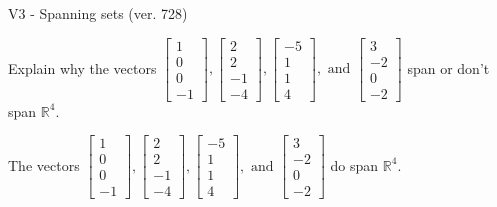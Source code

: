 \begin{exercise}
  \begin{exerciseTitle}V3 - Spanning sets (ver. 728)\end{exerciseTitle}
  \begin{exerciseStatement}
    Explain why the vectors \(\left[\begin{array}{r}
1 \\
0 \\
0 \\
-1
\end{array}\right] , \left[\begin{array}{r}
2 \\
2 \\
-1 \\
-4
\end{array}\right] , \left[\begin{array}{r}
-5 \\
1 \\
1 \\
4
\end{array}\right] , \text{ and } \left[\begin{array}{r}
3 \\
-2 \\
0 \\
-2
\end{array}\right]\) span or don't span \(\mathbb{R}^4\). 
	


  \end{exerciseStatement}
  \begin{exerciseAnswer}
   The vectors \(\left[\begin{array}{r}
1 \\
0 \\
0 \\
-1
\end{array}\right] , \left[\begin{array}{r}
2 \\
2 \\
-1 \\
-4
\end{array}\right] , \left[\begin{array}{r}
-5 \\
1 \\
1 \\
4
\end{array}\right] , \text{ and } \left[\begin{array}{r}
3 \\
-2 \\
0 \\
-2
\end{array}\right]\) 
  	 do  
	span \(\mathbb{R}^4\).
  


  \end{exerciseAnswer}
\end{exercise}